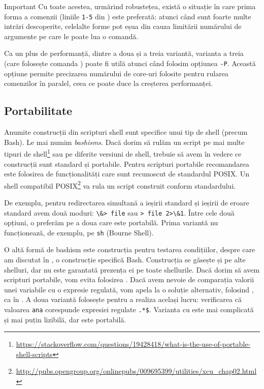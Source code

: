 \begin{note}{Important}
Cu toate acestea, urmărind robustețea, există o situație în care prima forma a comenzii  (liniile \texttt{1-5} din ) este preferată: atunci când sunt foarte multe intrări descoperite, celelalte forme pot eșua din cauza limitării numărului de argumente pe care le poate lua o comandă.
\end{note}

Ca un plus de performanță, dintre a doua și a treia variantă, varianta a treia (care folosește comanda ) poate fi utilă atunci când folosim opțiunea \texttt{-P}.
Această opțiune permite precizarea numărului de core-uri folosite pentru rularea comenzilor în paralel, ceea ce poate duce la creșterea performanței.

\subsection{Portabilitate}
\label{sec:auto:script-advanced:portable}

Anumite construcții din scripturi shell sunt specifice unui tip de shell (precum Bash).
Le mai numim \textit{bashisms}.
Dacă dorim să rulăm un script pe mai multe tipuri de shell\footnote{\url{https://stackoverflow.com/questions/19428418/what-is-the-use-of-portable-shell-scripts}} sau pe diferite versiuni de shell, trebuie să avem în vedere ce construcții sunt standard și portabile.
Pentru scripturi portabile recomandarea este folosirea de funcționalități care sunt recunoscut de standardul POSIX.
Un shell compatibil POSIX\footnote{\url{http://pubs.opengroup.org/onlinepubs/009695399/utilities/xcu\_chap02.html}} va rula un script construit conform standardului.

De exemplu, pentru redirectarea simultană a ieșirii standard și ieșirii de eroare standard avem două moduri: \verb|\&> file| sau \verb|> file 2>\&1|.
Între cele două opțiuni, o preferăm pe a doua care este portabilă.
Prima variantă nu funcționează, de exemplu, pe \texttt{sh} (Bourne Shell).

O altă formă de bashism este construcția \cmd{$[[$} pentru testarea condițiilor, despre care am discutat în , o construcție specifică Bash.
Construcția se găsește și pe alte shelluri, dar nu este garantată prezența ei pe toate shellurile.
Dacă dorim să avem scripturi portabile, vom evita folosirea \cmd{$[[$}.
Dacă avem nevoie de comparația valorii unei variabile cu o expresie regulată, vom apela la o soluție alternativ, folosind , ca în .
A doua variantă folosește  pentru a realiza același lucru: verificarea că valoarea \texttt{ana} corespunde expresiei regulate \texttt{.*\$}.
Varianta cu  este mai complicată și mai puțin lizibilă, dar este portabilă.

